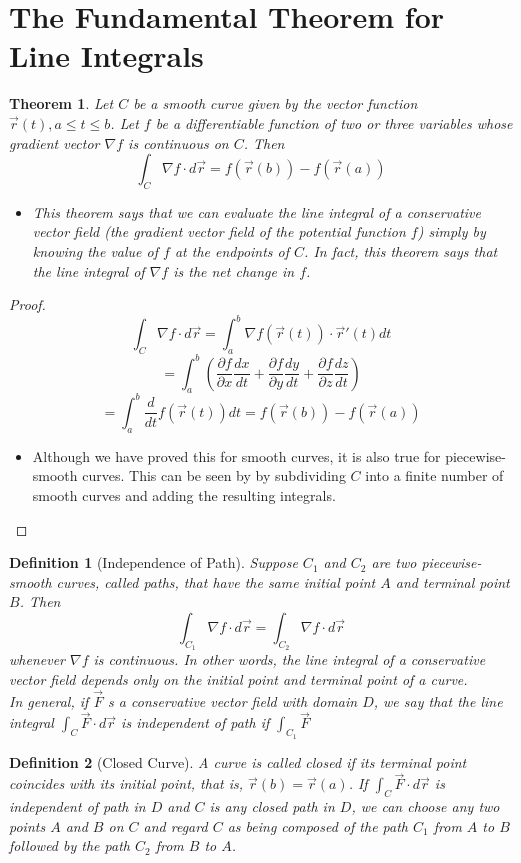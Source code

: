 \documentclass[10pt]{report}
\newtheorem{thm2}{Theorem}[section]
\newtheorem{def2}{Definition}[section]
\newcommand{\grad}{\nabla}
\begin{document}
\section{The Fundamental Theorem for Line Integrals}
\begin{thm2}
Let $C$ be a smooth curve given by the vector function $\vec{r}(t), a\leq t\leq b$. Let $f$ be a differentiable function of two or three variables whose gradient vector $\grad f$ is continuous on $C$. Then
$$\int_C \grad f\cdot d\vec{r} = f(\vec{r}(b))-f(\vec{r}(a))$$
\begin{itemize}
\item[Note:] This theorem says that we can evaluate the line integral of a conservative vector field (the gradient vector field of the potential function $f$) simply by knowing the value of $f$ at the endpoints of $C$. In fact, this theorem says that the line integral of $\grad f$ is the net change in $f$.
\end{itemize}
\end{thm2}
\begin{proof}
$$\int_C \grad f \cdot d\vec{r} = \int_a^b \grad f(\vec{r}(t)) \cdot \vec{r}'(t)dt$$
$$=\int_a^b\left( \frac{\partial f}{\partial x} \frac{dx}{dt} + \frac{\partial f}{\partial y} \frac{dy}{dt} + \frac{\partial f}{\partial z} \frac{dz}{dt}\right)$$
$$=\int_a^b\frac{d}{dt}f(\vec{r}(t))dt= f(\vec{r}(b))-f(\vec{r}(a))$$
\begin{itemize}
\item[Note:] Although we have proved this for smooth curves, it is also true for piecewise-smooth curves. This can be seen by by subdividing $C$ into a finite number of smooth curves and adding the resulting integrals.
\end{itemize}
\end{proof}
\begin{def2}[Independence of Path]
Suppose $C_1$ and $C_2$ are two piecewise-smooth curves, called paths, that have the same initial point $A$ and terminal point $B$. Then
$$\int_{C_1} \grad f\cdot d\vec{r} = \int_{C_2} \grad f\cdot d\vec{r}$$
whenever $\grad f$ is continuous. In other words, the line integral of a conservative vector field depends only on the initial point and terminal point of a curve.\\
In general, if $\vec{F}$ s a conservative vector field with domain $D$, we say that the line integral $\int_C \vec{F} \cdot d \vec{r}$ is independent of path if $\int_{C_1}\vec{F}$
\end{def2}
\begin{def2}[Closed Curve]
A curve is called closed if its terminal point coincides with its initial point, that is, $\vec{r}(b) = \vec{r}(a)$. If $\int_C \vec{F}\cdot d\vec{r}$ is independent of path in $D$ and $C$ is any closed path in $D$, we can choose any two points $A$ and $B$ on $C$ and regard $C$ as being composed of the path $C_1$ from $A$ to $B$ followed by the path $C_2$ from $B$ to $A$.
\end{def2}
\end{document}
